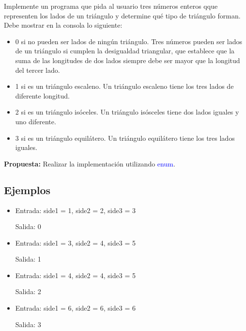 Implemente un programa que pida al usuario tres números enteros qque representen los lados de un triángulo y determine qué tipo de triángulo forman. Debe mostrar en la consola lo siguiente:
\begin{itemize}
	\item 0 si no pueden ser lados de ningún triángulo. Tres números pueden ser lados de un triángulo si cumplen la desigualdad triangular, que establece que la suma de las longitudes de dos lados siempre debe ser mayor que la longitud del tercer lado.
	\item 1 si es un triángulo escaleno. Un triángulo escaleno tiene los tres lados de diferente longitud.
	\item 2 si es un triángulo isóceles. Un triángulo isósceles tiene dos lados iguales y uno diferente.
	\item 3 si es un triángulo equilátero. Un triángulo equilátero tiene los tres lados iguales. 
\end{itemize}

\textbf{Propuesta:} Realizar la implementación utilizando \textcolor{blue}{enum}.

\subsection*{Ejemplos}
\begin{itemize}
    \item Entrada: side1 = 1, side2 = 2, side3 = 3

    Salida: 0

    \item Entrada: side1 = 3, side2 = 4, side3 = 5

    Salida: 1

    \item Entrada: side1 = 4, side2 = 4, side3 = 5

     Salida: 2

     \item Entrada: side1 = 6, side2 = 6, side3 = 6
     
     Salida: 3
\end{itemize}
